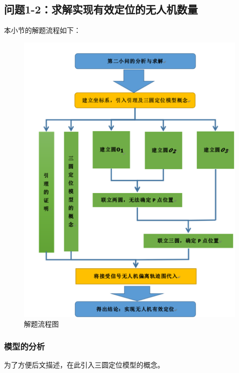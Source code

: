 \subsection{问题1-2：求解实现有效定位的无人机数量}

本小节的解题流程如下：

\begin{figure}[h]
    \centering
    \includegraphics[scale=0.8]{res/figure111919.png}
    \caption{解题流程图}
\end{figure}

\subsubsection{模型的分析}

为了方便后文描述，在此引入三圆定位模型的概念。\newline

